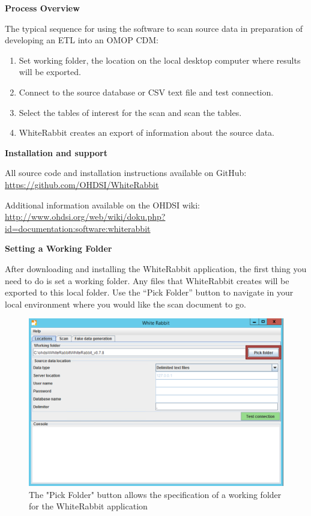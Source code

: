 \documentclass[11pt]{book}
\providecommand{\tightlist}{%
  \setlength{\itemsep}{0pt}\setlength{\parskip}{0pt}}
\theoremstyle{definition}
\theoremstyle{definition}
\theoremstyle{definition}
\theoremstyle{remark}
\begin{document}
\textbf{Process Overview}

The typical sequence for using the software to scan source data in preparation of developing an ETL into an OMOP CDM:

\begin{enumerate}
\def\labelenumi{\arabic{enumi}.}
\tightlist
\item
  Set working folder, the location on the local desktop computer where results will be exported.
\item
  Connect to the source database or CSV text file and test connection.
\item
  Select the tables of interest for the scan and scan the tables.
\item
  WhiteRabbit creates an export of information about the source data.
\end{enumerate}

\textbf{Installation and support}

All source code and installation instructions available on GitHub: \url{https://github.com/OHDSI/WhiteRabbit}

Additional information available on the OHDSI wiki: \url{http://www.ohdsi.org/web/wiki/doku.php?id=documentation:software:whiterabbit}

\textbf{Setting a Working Folder}

After downloading and installing the WhiteRabbit application, the first thing you need to do is set a working folder. Any files that WhiteRabbit creates will be exported to this local folder. Use the ``Pick Folder'' button to navigate in your local environment where you would like the scan document to go.

\begin{figure}
\includegraphics[width=1\linewidth]{images/ExtractTransformLoad/WhiteRabbitLocation} \caption{The "Pick Folder" button allows the specification of a working folder for the WhiteRabbit application}\label{fig:WhiteRabbitLocation}
\end{figure}
\end{document}
